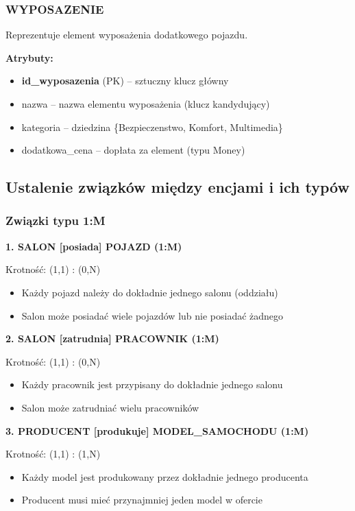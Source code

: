 \documentclass[a4paper,titleauthor]{mwart}
\begin{document}
	\subsubsection{WYPOSAZENIE}
	
	Reprezentuje element wyposażenia dodatkowego pojazdu.
	
	\textbf{Atrybuty:}
	\begin{itemize}
		\item \textbf{id\_wyposazenia} (PK) -- sztuczny klucz główny
		\item nazwa -- nazwa elementu wyposażenia (klucz kandydujący)
		\item kategoria -- dziedzina \{Bezpieczenstwo, Komfort, Multimedia\}
		\item dodatkowa\_cena -- dopłata za element (typu Money)
	\end{itemize}
	
	\subsection{Ustalenie związków między encjami i ich typów}
	
	\subsubsection{Związki typu 1:M}
	
	\textbf{1. SALON [posiada] POJAZD (1:M)}
	
	Krotność: (1,1) : (0,N)
	\begin{itemize}
		\item Każdy pojazd należy do dokładnie jednego salonu (oddziału)
		\item Salon może posiadać wiele pojazdów lub nie posiadać żadnego
	\end{itemize}
	
	\textbf{2. SALON [zatrudnia] PRACOWNIK (1:M)}
	
	Krotność: (1,1) : (0,N)
	\begin{itemize}
		\item Każdy pracownik jest przypisany do dokładnie jednego salonu
		\item Salon może zatrudniać wielu pracowników
	\end{itemize}
	
	\textbf{3. PRODUCENT [produkuje] MODEL\_SAMOCHODU (1:M)}
	
	Krotność: (1,1) : (1,N)
	\begin{itemize}
		\item Każdy model jest produkowany przez dokładnie jednego producenta
		\item Producent musi mieć przynajmniej jeden model w ofercie
	\end{itemize}
	
\end{document}
